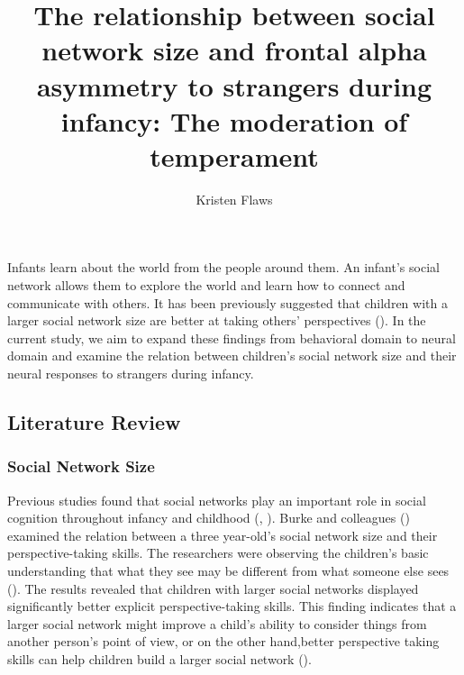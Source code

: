 \documentclass[
  man,
  floatsintext,
  longtable,
  nolmodern,
  notxfonts,
  notimes,
  colorlinks=true,linkcolor=blue,citecolor=blue,urlcolor=blue]{apa7}
\title{The relationship between social network size and frontal alpha
asymmetry to strangers during infancy: The moderation of temperament}
\author{Kristen Flaws}
\affiliation{
{MA Program in the Social Sciences, University of Chicago}}
\begin{document}
\maketitle


\setcounter{secnumdepth}{-\maxdimen} %

\setlength\LTleft{0pt}


Infants learn about the world from the people around them. An infant's
social network allows them to explore the world and learn how to connect
and communicate with others. It has been previously suggested that
children with a larger social network size are better at taking others'
perspectives (). In the current study, we aim to expand these findings from
behavioral domain to neural domain and examine the relation between
children's social network size and their neural responses to strangers
during infancy.

\subsection{Literature Review}\label{sec-lit-review}

\subsubsection{Social Network Size}\label{sec-social-network-size}

Previous studies found that social networks play an important role in
social cognition throughout infancy and childhood
(,
). Burke and
colleagues ()
examined the relation between a three year-old's social network size and
their perspective-taking skills. The researchers were observing the
children's basic understanding that what they see may be different from
what someone else sees
().
The results revealed that children with larger social networks displayed
significantly better explicit perspective-taking skills. This finding
indicates that a larger social network might improve a child's ability
to consider things from another person's point of view, or on the other
hand,better perspective taking skills can help children build a larger
social network ().
\end{document}
